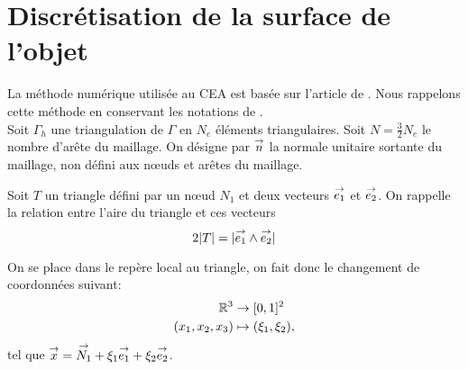\section{Discrétisation de la surface de l'objet}

  La méthode numérique utilisée au CEA  est basée sur l'article de \cite{medgyesi-mitschang_integral_1985}. Nous rappelons cette méthode en conservant les notations de \cite{stupfel_implementation_2015}.\\

  Soit \(\Gamma_h\) une triangulation de \(\Gamma\) en \(N_e\) éléments triangulaires. Soit \(N=\frac{3}{2}N_e\) le nombre d'arête du maillage. On désigne par \(\vn\) la normale unitaire sortante du maillage, non défini aux nœuds et arêtes du maillage.

  Soit \(T\) un triangle défini par un nœud \(N_1\) et deux vecteurs \(\vect{e_1}\) et \(\vect{e_2}\). On rappelle la relation entre l'aire du triangle et ces vecteurs
  \begin{equation*}
    2|T| = |\vect{e_1}\pvect\vect{e_2}|
  \end{equation*}

  \newcommand{\ncouche}{6}
  \newcommand{\setnodes}[6]{
      \renewcommand{\xa}{#1}
      \renewcommand{\ya}{#2}
      \renewcommand{\xb}{#3}
      \renewcommand{\yb}{#4}
      \renewcommand{\xc}{#5}
      \renewcommand{\yc}{#6}
  }
  \newcommand{\xa}{0.0}
  \newcommand{\ya}{0.0}
  \newcommand{\xb}{3.0}
  \newcommand{\yb}{0.0}
  \newcommand{\xc}{0.0}
  \newcommand{\yc}{3.0}
    \begin{center}
      \begin{tikzpicture}[scale=1]
        
      \end{tikzpicture}
    \end{center}
    \label{fig:form_int:fon_base:tri}

  On se place dans le repère local au triangle, on fait donc le changement de coordonnées suivant:
  \begin{align*}
    \RR^3 &\rightarrow [0,1]^2 \\
    (x_1,x_2,x_3) & \mapsto (\xi_1,\xi_2),
  \end{align*}
    tel que \(\vx =\vect{N_1}+ \xi_1 \vect{e_1} + \xi_2 \vect{e_2}\).


